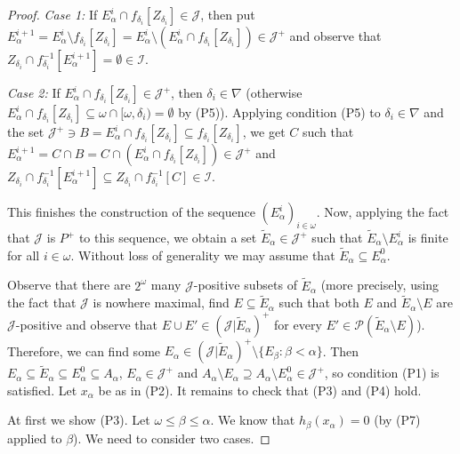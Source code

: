 \documentclass{amsart}
\theoremstyle{plain}
\theoremstyle{definition}
\theoremstyle{remark}
\newcommand{\cI}{\mathcal{I}}
\newcommand{\I}{\cI}
\newcommand{\cJ}{\mathcal{J}}
\newcommand{\J}{\cJ}
\newcommand{\cP}{\mathcal{P}}
\begin{document}
\begin{proof}
\smallskip

\textit{Case 1:} If $E_\alpha^i\cap f_{\delta_i}[Z_{\delta_i}]\in\J$, then put $E_\alpha^{i+1}=E_\alpha^i \setminus f_{\delta_i}[Z_{\delta_i}]=E_\alpha^i \setminus(E_\alpha^i\cap f_{\delta_i}[Z_{\delta_i}])\in\J^+$ and observe that $Z_{\delta_i}\cap f^{-1}_{\delta_i}[E_\alpha^{i+1}]=\emptyset\in \I$.

\smallskip

\textit{Case 2:} If $E_\alpha^i\cap f_{\delta_i}[Z_{\delta_i}]\in\J^+$, then $\delta_i\in\nabla$ (otherwise $E_\alpha^i\cap f_{\delta_i}[Z_{\delta_i}]\subseteq\omega\cap [\omega,\delta_i)=\emptyset$ by (P5)). Applying condition (P5) to $\delta_i\in\nabla$ and the set $\J^+\ni B=E_\alpha^i\cap f_{\delta_i}[Z_{\delta_i}]\subseteq f_{\delta_i}[Z_{\delta_i}]$, we get $C$ such that $E_\alpha^{i+1}=C\cap B=C\cap (E_\alpha^i\cap f_{\delta_i}[Z_{\delta_i}])\in\J^+$ and $Z_{\delta_i}\cap f_{\delta_i}^{-1}[E_\alpha^{i+1}]\subseteq Z_{\delta_i}\cap f_{\delta_i}^{-1}[C]\in\I$.

\smallskip

This finishes the construction of the sequence $(E_\alpha^i)_{i\in\omega}$. Now, applying the fact that $\J$ is $P^+$ to this sequence, we obtain a set $\tilde{E}_\alpha\in\J^+$ such that $\tilde{E}_\alpha\setminus E_\alpha^i$ is finite for all $i\in\omega$. Without loss of generality we may assume that $\tilde{E}_\alpha\subseteq E_\alpha^0$. 

Observe that there are $2^\omega$ many $\J$-positive subsets of $\tilde{E}_\alpha$ (more precisely, using the fact that $\J$ is nowhere maximal, find $E\subseteq \tilde{E}_\alpha$ such that both $E$ and $\tilde{E}_\alpha\setminus E$ are $\J$-positive and observe that $E\cup E'\in(\J|\tilde{E}_\alpha)^+$ for every $E'\in\cP(\tilde{E}_\alpha\setminus E)$). Therefore, we can find some $E_\alpha\in (\J|\tilde{E}_\alpha)^+\setminus\{E_\beta:\beta<\alpha\}$. Then $E_\alpha\subseteq \tilde{E}_\alpha\subseteq E^0_\alpha\subseteq A_\alpha$, $E_\alpha\in\J^+$ and $A_\alpha\setminus E_\alpha\supseteq A_\alpha\setminus E^0_\alpha\in\J^+$, so condition (P1) is satisfied. Let $x_\alpha$ be as in (P2). It remains to check that (P3) and (P4) hold. 

\smallskip

At first we show (P3). Let $\omega \leq \beta \leq \alpha$. We know that $h_\beta(x_\alpha)=0 $ (by (P7) applied to $\beta$). We need to consider two cases.

\smallskip


\end{proof}
\end{document}
